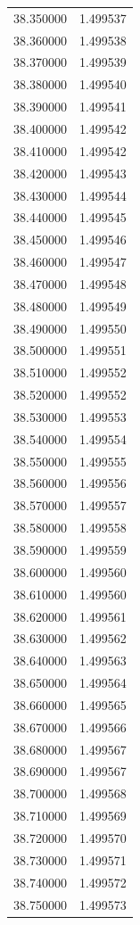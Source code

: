 \begin{tabular}{rr}
38.350000 & 1.499537 \\
38.360000 & 1.499538 \\
38.370000 & 1.499539 \\
38.380000 & 1.499540 \\
38.390000 & 1.499541 \\
38.400000 & 1.499542 \\
38.410000 & 1.499542 \\
38.420000 & 1.499543 \\
38.430000 & 1.499544 \\
38.440000 & 1.499545 \\
38.450000 & 1.499546 \\
38.460000 & 1.499547 \\
38.470000 & 1.499548 \\
38.480000 & 1.499549 \\
38.490000 & 1.499550 \\
38.500000 & 1.499551 \\
38.510000 & 1.499552 \\
38.520000 & 1.499552 \\
38.530000 & 1.499553 \\
38.540000 & 1.499554 \\
38.550000 & 1.499555 \\
38.560000 & 1.499556 \\
38.570000 & 1.499557 \\
38.580000 & 1.499558 \\
38.590000 & 1.499559 \\
38.600000 & 1.499560 \\
38.610000 & 1.499560 \\
38.620000 & 1.499561 \\
38.630000 & 1.499562 \\
38.640000 & 1.499563 \\
38.650000 & 1.499564 \\
38.660000 & 1.499565 \\
38.670000 & 1.499566 \\
38.680000 & 1.499567 \\
38.690000 & 1.499567 \\
38.700000 & 1.499568 \\
38.710000 & 1.499569 \\
38.720000 & 1.499570 \\
38.730000 & 1.499571 \\
38.740000 & 1.499572 \\
38.750000 & 1.499573 \\

\end{tabular}
